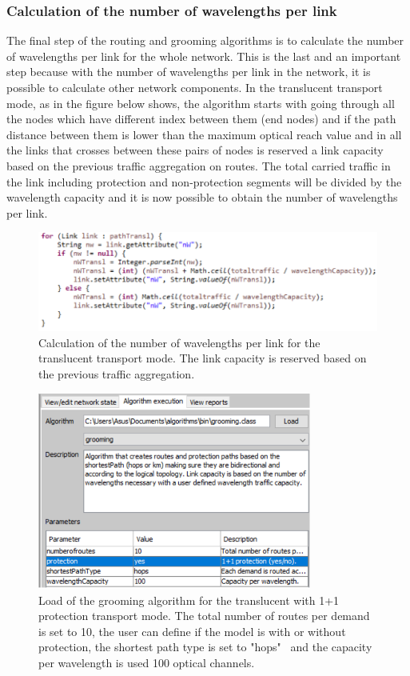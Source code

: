 \subsubsection{Calculation of the number of wavelengths per link}

\vspace{11pt}
The final step of the routing and grooming algorithms is to calculate the number of wavelengths per link for the whole network. This is the last and an important step because with the number of wavelengths per link in the network, it is possible to calculate other network components. In the translucent transport mode, as in the figure below shows, the algorithm starts with going through all the nodes which have different index between them (end nodes) and if the path distance between them is lower than the maximum optical reach value and in all the links that crosses between these pairs of nodes is reserved a link capacity based on the previous traffic aggregation on routes. The total carried traffic in the link including protection and non-protection segments will be divided by the wavelength capacity and it is now possible to obtain the number of wavelengths per link.

\begin{figure}[H]
\centering
\includegraphics[width=12cm]{sdf/heuristic/translucent_protection/figures/grooming_translucent_protec5}
\caption{Calculation of the number of wavelengths per link for the translucent transport mode. The link capacity is reserved based on the previous traffic aggregation.}
\label{grooming_translucent_protec5}
\end{figure}

\begin{figure}[H]
\centering
\includegraphics[width=9cm]{sdf/heuristic/translucent_protection/figures/grooming_translucent_protec6}
\caption{Load of the grooming algorithm for the translucent with 1+1 protection transport mode. The total number of routes per demand is set to 10, the user can define if the model is with or without protection, the shortest path type is set to "hops" \ and the capacity per wavelength is used 100 optical channels.}
\label{grooming_translucent_protec6}
\end{figure}


